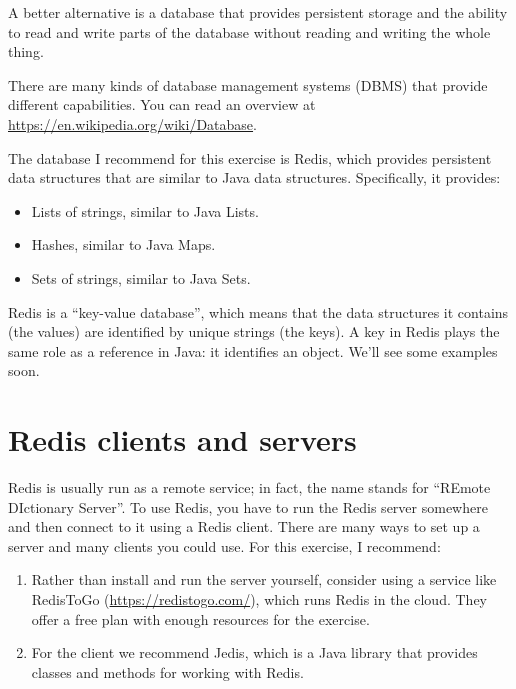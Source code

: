 \documentclass[12pt]{book}
\theoremstyle{exercise}
\begin{document}
A better alternative is a database that provides persistent storage and
the ability to read and write parts of the database without reading and
writing the whole thing.

There are many kinds of database management systems (DBMS) that provide
different capabilities. You can read an overview at
\url{https://en.wikipedia.org/wiki/Database}.

The database I recommend for this exercise is Redis, which provides
persistent data structures that are similar to Java data structures.
Specifically, it provides:

\begin{itemize}

\item
  Lists of strings, similar to Java Lists.

\item
  Hashes, similar to Java Maps.

\item
  Sets of strings, similar to Java Sets.

\end{itemize}

Redis is a ``key-value database'', which means that the data structures
it contains (the values) are identified by unique strings (the keys). A
key in Redis plays the same role as a reference in Java: it identifies
an object. We'll see some examples soon.


\section{Redis clients and servers}
\label{redis-clients-and-servers}

Redis is usually run as a remote service; in fact, the name stands for
``REmote DIctionary Server''. To use Redis, you have to run the Redis
server somewhere and then connect to it using a Redis client. There are
many ways to set up a server and many clients you could use. For this
exercise, I recommend:

\begin{enumerate}

\item
  Rather than install and run the server yourself, consider using a
  service like RedisToGo (\url{https://redistogo.com/}), which runs
  Redis in the cloud. They offer a free plan with enough resources for
  the exercise.

\item
  For the client we recommend Jedis, which is a Java library that
  provides classes and methods for working with Redis.

\end{enumerate}
\end{document}
